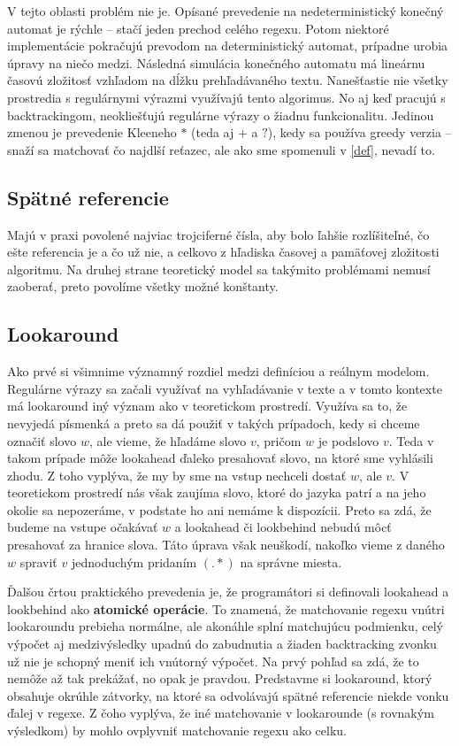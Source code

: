 
V tejto oblasti problém nie je. Opísané prevedenie na nedeterministický konečný automat je rýchle -- stačí jeden prechod celého regexu. Potom niektoré implementácie pokračujú prevodom na deterministický automat, prípadne urobia úpravy na niečo medzi. Nás\-led\-ná simulácia konečného automatu má lineárnu časovú zložitosť vzhľadom na dĺžku prehľadávaného textu\cite{ExtendedRegexPower}. Nanešťastie nie všetky prostredia s regulárnymi výrazmi využívajú tento algorimus. No aj keď pracujú s backtrackingom, neokliešťujú regulárne výrazy o žiadnu funkcionalitu. Jedinou zmenou je prevedenie Kleeneho $*$ (teda aj $+$ a $?$), kedy sa používa greedy verzia -- snaží sa matchovať čo najdlší reťazec, ale ako sme spomenuli v \ref{def}, nevadí to.

\subsection*{Spätné referencie}
\label{praxbackref}

Majú v praxi povolené najviac trojciferné čísla\cite{Python3Documentation}, aby bolo ľahšie rozlíšiteľné, čo ešte referencia je a čo už nie, a celkovo z hľadiska časovej a pamäťovej zložitosti algoritmu. Na druhej strane teoretický model sa takýmito problémami nemusí zaoberať, preto povolíme všetky možné konštanty.

\subsection*{Lookaround}
\label{praxla}

Ako prvé si všimnime významný rozdiel medzi definíciou a reálnym modelom. Re\-gu\-lár\-ne výrazy sa začali využívať na vyhľadávanie v texte a v tomto kontexte má lookaround iný význam ako v teoretickom prostredí. Využíva sa to, že nevyjedá písmenká a preto sa dá použiť v takých prípadoch, kedy si chceme označiť slovo $w$, ale vieme, že hľadáme slovo $v$, pričom $w$ je podslovo $v$. Teda v takom prípade môže look\-ahead ďaleko presahovať slovo, na ktoré sme vyhlásili zhodu. Z toho vyplýva, že my by sme na vstup nechceli dostať $w$, ale $v$. V teoretickom prostredí nás však zaujíma slovo, ktoré do jazyka patrí a na jeho okolie sa nepozeráme, v podstate ho ani nemáme k dispozícii. Preto sa zdá, že budeme na vstupe očakávať $w$ a lookahead či lookbehind nebudú môcť presahovať za hranice slova. Táto úprava však neuškodí, nakoľko vieme z daného $w$ spraviť $v$ jednoduchým pridaním $(.*)$ na správne miesta.

Ďalšou črtou praktického prevedenia je, že programátori si definovali lookahead a lookbehind ako \textbf{atomické operácie}\cite{LApracticalnote}. To znamená, že matchovanie regexu vnútri lookaroundu prebieha normálne, ale akonáhle splní matchujúcu podmienku, celý výpočet aj medzivýsledky upadnú do zabudnutia a žiaden back\-tracking zvonku už nie je schopný meniť ich vnútorný výpočet. Na prvý pohľad sa zdá, že to nemôže až tak prekážať, no opak je pravdou. Predstavme si lookaround, ktorý obsahuje okrúhle zátvorky, na ktoré sa odvolávajú spätné referencie niekde vonku ďalej v regexe. Z čoho vyplýva, že iné matchovanie v lookarounde (s rovnakým výsledkom) by mohlo ovplyvniť matchovanie regexu ako celku.

